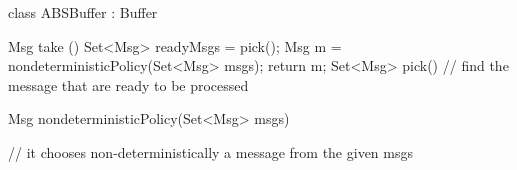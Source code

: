 class ABSBuffer : Buffer {

    Msg take ()
    {
        Set<Msg> readyMsgs = pick();
        Msg m = nondeterministicPolicy(Set<Msg> msgs);
        return m;
    }
    Set<Msg> pick() {
        // find the message that are ready to be processed
    }
    
     Msg nondeterministicPolicy(Set<Msg> msgs)
    {
        // it chooses non-deterministically a message from the given msgs

    }

}